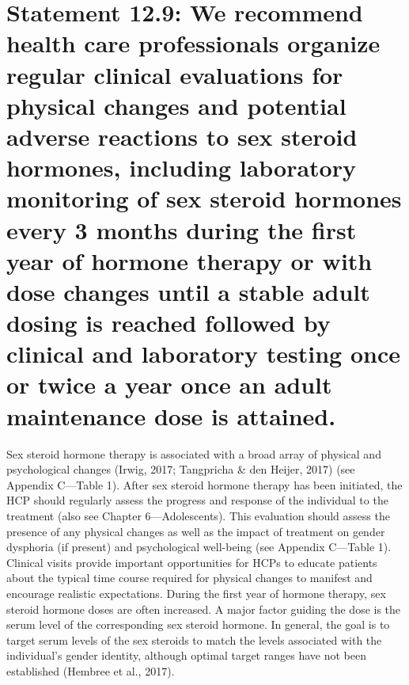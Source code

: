 \documentclass[
]{book}
\begin{document}
\hypertarget{statement-12.9-we-recommend-health-care-professionals-organize-regular-clinical-evaluations-for-physical-changes-and-potential-adverse-reactions-to-sex-steroid-hormones-including-laboratory-monitoring-of-sex-steroid-hormones-every-3-months-during-the-first-year-of-hormone-therapy-or-with-dose-changes-until-a-stable-adult-dosing-is-reached-followed-by-clinical-and-laboratory-testing-once-or-twice-a-year-once-an-adult-maintenance-dose-is-attained.}{%
\section*{Statement 12.9: We recommend health care professionals organize regular clinical evaluations for physical changes and potential adverse reactions to sex steroid hormones, including laboratory monitoring of sex steroid hormones every 3 months during the first year of hormone therapy or with dose changes until a stable adult dosing is reached followed by clinical and laboratory testing once or twice a year once an adult maintenance dose is attained.}\label{statement-12.9-we-recommend-health-care-professionals-organize-regular-clinical-evaluations-for-physical-changes-and-potential-adverse-reactions-to-sex-steroid-hormones-including-laboratory-monitoring-of-sex-steroid-hormones-every-3-months-during-the-first-year-of-hormone-therapy-or-with-dose-changes-until-a-stable-adult-dosing-is-reached-followed-by-clinical-and-laboratory-testing-once-or-twice-a-year-once-an-adult-maintenance-dose-is-attained.}}

Sex steroid hormone therapy is associated with
a broad array of physical and psychological
changes (Irwig, 2017; Tangpricha \& den Heijer,
2017) (see Appendix C---Table 1). After sex steroid hormone therapy has been initiated, the
HCP should regularly assess the progress and
response of the individual to the treatment (also
see Chapter 6---Adolescents). This evaluation
should assess the presence of any physical changes
as well as the impact of treatment on gender
dysphoria (if present) and psychological well-being
(see Appendix C---Table 1). Clinical visits provide
important opportunities for HCPs to educate
patients about the typical time course required
for physical changes to manifest and encourage
realistic expectations. During the first year of
hormone therapy, sex steroid hormone doses are
often increased. A major factor guiding the dose
is the serum level of the corresponding sex steroid hormone. In general, the goal is to target
serum levels of the sex steroids to match the
levels associated with the individual's gender
identity, although optimal target ranges have not
been established (Hembree et al., 2017).
\end{document}
